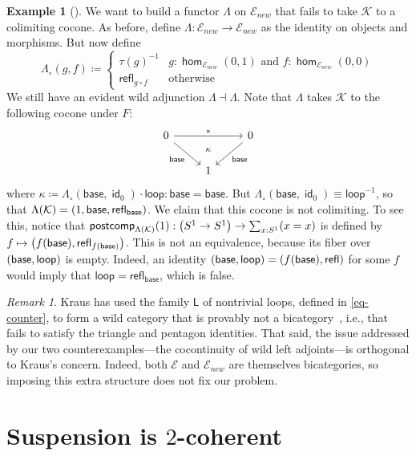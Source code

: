 \documentclass[10pt,a4paper]{article}
\theoremstyle{definition}
\newtheorem{exa}[thm]{Example}
\theoremstyle{remark}
\newtheorem{rem}[thm]{Remark}
\newcommand{\E}{\mathcal E}
\newcommand{\K}{\mathcal K}
\renewcommand{\L}{\mathsf L}
\newcommand{\base}{\mathsf{base}}
\newcommand{\loopp}{\mathsf{loop}}
\newcommand{\refl}{\mathsf{refl}}
\newcommand{\0}{\mathbf{0}}
\newcommand{\1}{\mathbf{1}}
\newcommand{\2}{\mathbf{2}}
\DeclareMathOperator{\homm}{\mathsf{hom}}
\DeclareMathOperator{\idd}{\mathsf{id}}
\DeclareMathOperator{\postcomp}{\mathsf{postcomp}}
\newcommand{\myhref}[2]{%
  \href{#1}{\textcolor{blue!30!black}{#2}}%
}
\begin{document}
\begin{exa}[{\cite[\myhref{https://github.com/PHart3/colimits-agda/blob/lapc-lmcs/HoTT-Agda/core/lib/wild-cats/LAPC-counterexmp.agda}{LAPC-counterexmp}]{2cohagda-pub}}]
We want to build a functor $\Lambda$ on $\E_{\textit{new}}$ that fails to take $\K$ to a colimiting cocone. As before, define $\Lambda : \E_{\textit{new}} \to \E_{\textit{new}}$ as the identity on objects and morphisms. But now define \[
\Lambda_{\circ}(g,f) \coloneqq 
\begin{cases}
\tau(g)^{-1}  & \text{$g : \homm_{\E_{\textit{new}}}(0, 1)$ and $f : \homm_{\E_{\textit{new}}}(0, 0)$} \\  
\refl_{g \circ f} & \text{otherwise}
\end{cases}
\] We still have an evident wild adjunction $\Lambda \dashv \Lambda$. Note that $\Lambda$ takes $\K$ to the following cocone under $F$: 
\[\begin{tikzcd}
	0 && 0 \\
	& 1
	\arrow[""{name=0, anchor=center, inner sep=0}, "\ast", from=1-1, to=1-3]
	\arrow["{\base}"', from=1-1, to=2-2]
	\arrow["{\base}", from=1-3, to=2-2]
	\arrow["{\kappa}"{description}, draw=none, from=0, to=2-2]
\end{tikzcd}\]
where $\kappa \coloneqq \Lambda_{\circ}(\base, \idd_0) \cdot \loopp : \base = \base$.
But $\Lambda_{\circ}(\base, \idd_0) \equiv \loopp^{-1}$, so that $\Lambda(\K) = \mleft(1, \base, \refl_{\base}\mright)$. We claim that this cocone is not colimiting. To see this, notice that $\postcomp_{\Lambda(\K)}(1) : \mleft(S^1 \to S^1\mright) \to \sum_{x : S^1}\mleft(x = x\mright)$ is defined by $f \mapsto \mleft(f(\base), \refl_{f(\base)}\mright)$. This is not an equivalence, because its fiber over $\mleft(\base, \loopp\mright)$ is empty. Indeed, an identity $\mleft(\base, \loopp\mright) = \mleft(f(\base), \refl\mright)$ for some $f$ would imply that $\loopp = \refl_{\base}$, which is false. 
\end{exa}

\begin{rem}
Kraus has used the family $\L$ of nontrivial loops, defined in \autoref{eq-counter}, to form a wild category that is provably not a bicategory~\cite[Lemma 8]{eating}, i.e., that fails to satisfy the triangle and pentagon identities. That said, the issue addressed by our two counterexamples---the cocontinuity of wild left adjoints---is orthogonal to Kraus's concern. Indeed, both $\E$ and $\E_{\textit{new}}$ are themselves bicategories, so imposing this extra structure does not fix our problem.
\end{rem}

\section{Suspension is $2$-coherent} \label{SuspCol}
\end{document}
